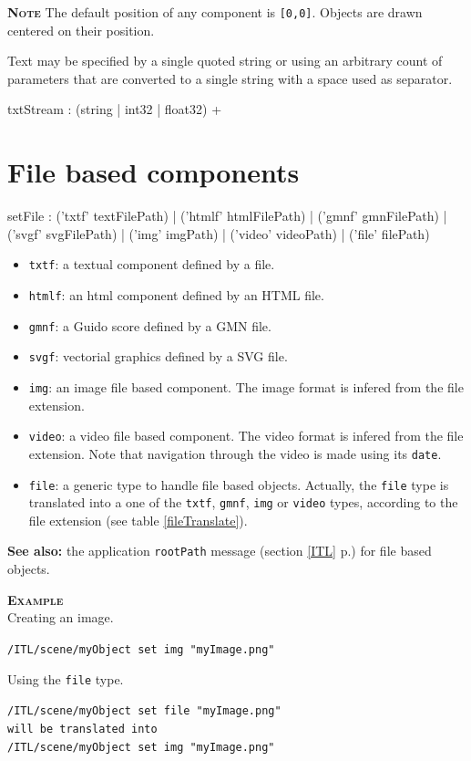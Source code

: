 \documentclass[a4paper,twoside]{report}
\newcommand{\sublevel}[1]	{\section{#1}}
\newcommand{\fullref}[1]	{\ref{#1} p.\pageref{#1}}
\newcommand{\OSC}[1]		{\texttt{#1}}
\newcommand{\values}[1]	{\texttt{#1}}
\newcommand{\example}		{\textbf{\hspace{-1.5cm}\textbf{\textsc{Example }}}}
\newcommand{\note}	[1]		{\vspace{2mm}\textbf{\hspace{-1.03cm}\textbf{\textsc{Note #1}}}}
\renewcommand{\seealso}	{\textbf{See also: }}
\newcommand{\sample}	[1]			{\vspace{-2mm}\begin{center}\colorbox{mygrey}{
								\begin{minipage}[t]{0.9\columnwidth} 
								{\small \texttt{#1}}
								\end{minipage}}\end{center}}
\begin{document}
\note{} The default position of any component is \values{[0,0]}. Objects are drawn centered on their position.

Text may be specified by a single quoted string or using an arbitrary count of parameters that are converted to a single string with a space used as separator.
\begin{rail}
txtStream :  (string | int32 | float32) +
\end{rail}


\sublevel{File based components}
\label{fileset}


\label{setfile}
\begin{rail}
setFile : 
	('txtf' textFilePath) |
	('htmlf' htmlFilePath) |
	('gmnf' gmnFilePath) |
	('svgf' svgFilePath) |
	('img' imgPath) |
	('video' videoPath) |
	('file' filePath)
\end{rail}

\begin{itemize}
\item \OSC{txtf}: a textual component defined by a file.
\item \OSC{htmlf}: an html component defined by an HTML file.
\item \OSC{gmnf}: a Guido score defined by a GMN file.
\item \OSC{svgf}: vectorial graphics defined by a SVG file.
\item \OSC{img}: an image file based component. The image format is infered from the file extension.
\item \OSC{video}: a video file based component. The video format is infered from the file extension. Note that navigation through the video is made using its \OSC{date}.
\item \OSC{file}: a generic type to handle file based objects. Actually, the \OSC{file} type is translated into a one of the \OSC{txtf}, \OSC{gmnf}, \OSC{img} or \OSC{video} types, according to the file extension (see table \ref{fileTranslate}).
\end{itemize}

\seealso the application \OSC{rootPath} message (section \fullref{ITL}) for file based objects.

\example \\
Creating an image.
\sample{/ITL/scene/myObject set img "myImage.png"}
Using the \OSC{file} type.
\sample{/ITL/scene/myObject set file "myImage.png" \\
will be translated into \\
/ITL/scene/myObject set img "myImage.png"
}
\end{document}
